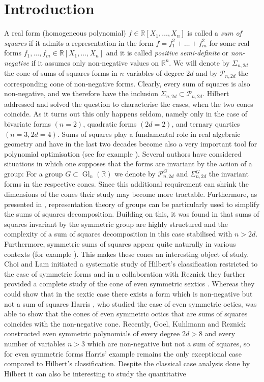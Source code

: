 \documentclass[11pt,a4paper]{amsart}
\numberwithin{equation}{section}
\theoremstyle{definition}
\newcommand{\R}{\mathbb{R}}
\DeclareMathOperator{\Gl}{Gl}
\numberwithin{thm}{section}
\theoremstyle{break}
\numberwithin{subcase}{case}
\begin{document}
\section{Introduction}
A real form (homogeneous polynomial) $f\in\R[X_1,\ldots,X_n]$ is called 
a \emph{sum of squares} if it admits  a representation in the form $f=f_1^2+\ldots+ f_m^2$ for some real forms $f_1,\ldots,f_m\in\R[X_1,\ldots, X_n]$ and it is called \emph{positive semi-definite} or \emph{non-negative} if it assumes only non-negative values on $\R^n$.
We will denote  by $\Sigma_{n,2d}$ the cone of sums of squares forms in $n$ variables of degree $2d$ and by $\mathcal{P}_{n,2d}$ the corresponding  cone of non-negative forms. Clearly, every sum of squares is also non-negative, and we therefore have the inclusion $\Sigma_{n,2d}\subset\mathcal{P}_{n,2d}$. Hilbert \cite{hilbert1888darstellung} addressed and solved the question to characterise the cases, when the two cones coincide. As it turns out this only happens seldom, namely only in the case of bivariate forms $(n=2)$, quadratic forms $(2d=2)$, and ternary quartics $(n=3,2d=4)$. Sums of squares play a fundamental role in real algebraic geometry and have in the last two decades become also a very important tool for polynomial optimisation (see for example \cite{scheiderer2009positivity}). Several authors have considered  situations in which one supposes that the forms are invariant by the action of a group: For a group $G\subset \Gl_n(\R)$ we denote by $\mathcal{P}_{n,2d}^G$ and $\Sigma_{n,2d}^G$ the invariant forms in the respective cones. Since this additional requirement can shrink the dimensions of the cones their study may become more tractable. Furthermore, as presented in \cite{gatermann2004symmetry}, representation theory of groups can be  particularly used to simplify the sums of squares decomposition. Building on this, it was found in \cite{riener2013exploiting,phdthesis} that sums of squares invariant by the symmetric group are highly structured and the complexity of a sum of squares decomposition in this case stabilised with $n>2d$.  Furthermore, symmetric sums of squares appear quite naturally in various contexts (for example \cite{raymond2018symmetric}). This makes these cones an interesting object of study. Choi and Lam \cite{choi1977old} initiated a systematic study of Hilbert's classification restricted to the case of symmetric forms and in a collaboration  with Reznick they further provided a complete study of the cone of  even symmetric sextics \cite{choi1987even}. Whereas they could show that in the sextic case there exists a form which is non-negative but not a sum of squares Harris \cite{harris1999real}, who studied the case of even symmetric octics, was able to show that the cones of even symmetric octics that are sums of squares coincides with the non-negative cone. Recently, Goel, Kuhlmann and Reznick \cite{goel2017analogue} constructed even symmetric polynomials of every degree $2d>8$ and every number of variables $n>3$ which are non-negative but not a sum of squares, so for even symmetric forms Harris' example remains the only exceptional case compared to Hilbert's classification. Despite the classical case analysis done by Hilbert it can also be interesting to study the quantitative 
\end{document}
